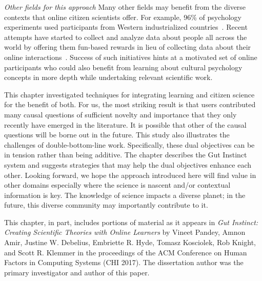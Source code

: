 \textit{Other fields for this approach}
Many other fields may benefit from the diverse contexts that online citizen scientists offer. For example, 96\% of psychology experiments used participants from Western industrialized countries~\cite{Henrich2010a}. Recent attempts have started to collect and analyze data about people all across the world by offering them fun-based rewards in lieu of collecting data about their online interactions~\cite{Reinecke2015}. Success of such initiatives hints at a motivated set of online participants who could also benefit from learning about cultural psychology concepts in more depth while undertaking relevant scientific work. 


This chapter investigated techniques for integrating learning and citizen science for the benefit of both. For us, the most striking result is that users contributed many causal questions of sufficient novelty and importance that they only recently have emerged in the literature. It is possible that other of the causal questions will be borne out in the future. This study also illustrates the challenges of double-bottom-line work. Specifically, these dual objectives can be in tension rather than being additive. The chapter describes the Gut Instinct system and suggests strategies that may help the dual objectives enhance each other. Looking forward, we hope the approach introduced here will find value in other domains especially where the science is nascent and/or contextual information is key. The knowledge of science impacts a diverse planet; in the future, this diverse community may importantly contribute to it.


This chapter, in part, includes portions of material as it appears in \emph{Gut Instinct: Creating Scientific Theories with Online Learners} by Vineet Pandey, Amnon Amir, Justine W. Debelius, Embriette R. Hyde, Tomasz Kosciolek, Rob Knight, and Scott R. Klemmer in the proceedings of the ACM Conference on Human Factors in Computing Systems (CHI 2017). The dissertation author was the primary investigator and author of this paper.
